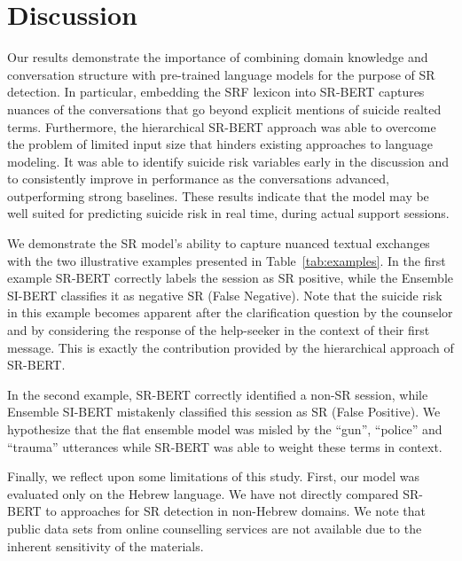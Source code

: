\documentclass[letterpaper]{article} %
\begin{document}
\section{Discussion}
Our results demonstrate the importance of combining domain knowledge and conversation structure with pre-trained language models for the purpose of SR detection. 
In particular, embedding the SRF lexicon into SR-BERT captures nuances of the conversations that go beyond explicit mentions of suicide realted terms. 
Furthermore, the  hierarchical SR-BERT approach was able to overcome the problem of limited input size that hinders existing approaches to language modeling.  It was able to identify suicide risk variables early in the discussion and to consistently improve in performance as the conversations advanced, outperforming strong baselines.    These  results indicate that the model may be well suited for predicting suicide risk in real time, during actual support sessions.

We demonstrate the SR model's ability to capture nuanced textual exchanges with the two  illustrative examples presented in Table~\ref{tab:examples}. In the first example  SR-BERT correctly labels the session as SR positive, while the Ensemble SI-BERT classifies it as negative SR (False Negative). 
Note that the suicide risk in this example becomes apparent after the clarification question by the counselor and by considering the response of the help-seeker in the context of their first message. 
This is exactly the  contribution provided by the hierarchical approach of SR-BERT.

In the second example, SR-BERT correctly identified a non-SR session, while Ensemble SI-BERT mistakenly classified this session as SR (False Positive). We hypothesize that the flat ensemble model was misled by the ``gun'', ``police'' and ``trauma'' utterances while SR-BERT was able to weight these terms in context. 

Finally, we  reflect upon some limitations of this study. First, our model was evaluated only on the Hebrew language. We have not directly compared SR-BERT to  approaches for SR detection in non-Hebrew domains.  We note that public data sets from online counselling services  are not available due to the inherent sensitivity of the materials. 
\end{document}

